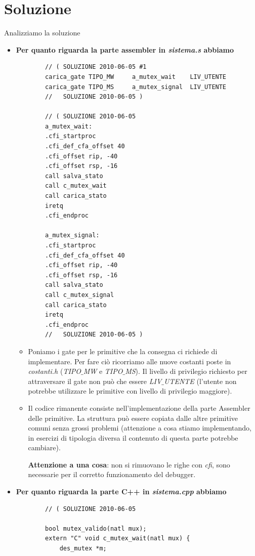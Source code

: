 \section*{Soluzione}
Analizziamo la soluzione
\begin{itemize} 
	\item \textbf{Per quanto riguarda la parte assembler in \emph{sistema.s} abbiamo }
	\begin{verbatim}
		// ( SOLUZIONE 2010-06-05 #1
		carica_gate	TIPO_MW		a_mutex_wait	LIV_UTENTE
		carica_gate	TIPO_MS		a_mutex_signal	LIV_UTENTE
		//   SOLUZIONE 2010-06-05 )
		
		// ( SOLUZIONE 2010-06-05
		a_mutex_wait:
		.cfi_startproc
		.cfi_def_cfa_offset 40
		.cfi_offset rip, -40
		.cfi_offset rsp, -16
		call salva_stato
		call c_mutex_wait
		call carica_stato
		iretq
		.cfi_endproc
		
		a_mutex_signal:
		.cfi_startproc
		.cfi_def_cfa_offset 40
		.cfi_offset rip, -40
		.cfi_offset rsp, -16
		call salva_stato
		call c_mutex_signal
		call carica_stato
		iretq
		.cfi_endproc
		//   SOLUZIONE 2010-06-05 )
	\end{verbatim}
	\begin{itemize}
		\item Poniamo i gate per le primitive che la consegna ci richiede di implementare. Per fare ciò ricorriamo alle nuove costanti poste in \emph{costanti.h} (\emph{TIPO$\_$MW} e \emph{TIPO$\_$MS}). Il livello di privilegio richiesto per attraversare il gate non può che essere \emph{LIV$\_$UTENTE} (l'utente non potrebbe utilizzare le primitive con livello di privilegio maggiore).
		\item Il codice rimanente consiste nell'implementazione della parte Assembler delle primitive. La struttura può essere copiata dalle altre primitive comuni senza grossi problemi (attenzione a cosa stiamo implementando, in esercizi di tipologia diversa il contenuto di questa parte potrebbe cambiare).
		
		\textbf{Attenzione a una cosa}: non si rimuovano le righe con \emph{cfi}, sono necessarie per il corretto funzionamento del debugger.
	\end{itemize}
	\item \textbf{Per quanto riguarda la parte C++ in \emph{sistema.cpp} abbiamo}
	\begin{verbatim}
		// ( SOLUZIONE 2010-06-05 
		
		bool mutex_valido(natl mux);
		extern "C" void c_mutex_wait(natl mux) {
			des_mutex *m;
			

\end{verbatim}
\end{itemize}
